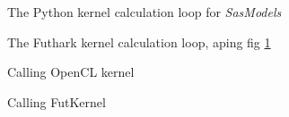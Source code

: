 \documentclass[11pt]{article}
\newcommand{\sasmodels}{\textit{SasModels}}
\begin{document}
\begin{figure}
  
  \label{fig:kernelpy_loop}
  \caption{The Python kernel calculation loop for \sasmodels}
\end{figure}

\begin{figure}
  
  \label{fig:kernelfut_loop}
  \caption{The Futhark kernel calculation loop, aping fig \ref{fig:kernelpy_loop}}
\end{figure}

\begin{figure}
  
  \label{fig:kernelcl_call}
  \caption{Calling OpenCL kernel}
\end{figure}

\begin{figure}
  
  \label{fig:kernelfut_call}
  \caption{Calling FutKernel}
\end{figure}
\end{document}
